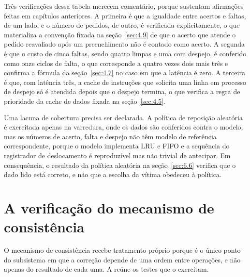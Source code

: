 Três verificações dessa tabela merecem comentário, porque sustentam afirmações feitas em capítulos anteriores. A primeira é que a igualdade entre acertos e faltas, de um lado, e o número de pedidos, de outro, é verificada explicitamente, o que materializa a convenção fixada na seção~\ref{sec:4.9} de que o acerto que atende o pedido reavaliado após um preenchimento não é contado como acerto. A segunda é que o custo de cinco faltas, sendo quatro limpas e uma com despejo, é conferido como onze ciclos de falta, o que corresponde a quatro vezes dois mais três e confirma a fórmula da seção~\ref{sec:4.7} no caso em que a latência é zero. A terceira é que, com latência três, a cache de instruções que solicita uma linha em processo de despejo só é atendida depois que o despejo termina, o que verifica a regra de prioridade da cache de dados fixada na seção~\ref{sec:4.5}.

Uma lacuna de cobertura precisa ser declarada. A política de reposição aleatória é exercitada apenas na varredura, onde os dados são conferidos contra o modelo, mas os números de acerto, falta e despejo não têm modelo de referência correspondente, porque o modelo implementa LRU e FIFO e a sequência do registrador de deslocamento é reproduzível mas não trivial de antecipar. Em consequência, o resultado da política aleatória na seção~\ref{sec:6.6} verifica que o dado lido está correto, e não que a escolha da vítima obedeceu à política.

\section{A verificação do mecanismo de consistência}\label{sec:6.3}

O mecanismo de consistência recebe tratamento próprio porque é o único ponto do subsistema em que a correção depende de uma ordem entre operações, e não apenas do resultado de cada uma. A  reúne os testes que o exercitam.

